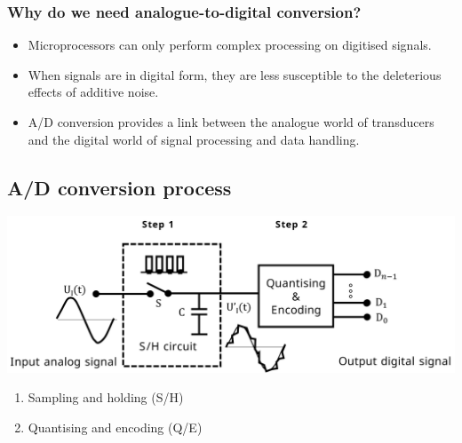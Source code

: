 \documentclass[11pt]{article}
\begin{document}
\subsubsection{Why do we need analogue-to-digital conversion?}
\label{sec:org5dd2cb0}
\begin{itemize}
\item Microprocessors can only perform complex processing on digitised signals.
\item When signals are in digital form, they are less susceptible to the deleterious effects of additive noise.
\item A/D conversion provides a link between the analogue world of transducers and the digital world of signal processing and data handling.
\end{itemize}
\subsection{A/D conversion process}
\label{sec:orgf2305aa}
\begin{center}
\includegraphics[width=.9\linewidth]{./images/a-d-conversion-process.png}
\end{center}

\begin{enumerate}
\item Sampling and holding (S/H)
\item Quantising and encoding (Q/E)
\end{enumerate}
\end{document}
